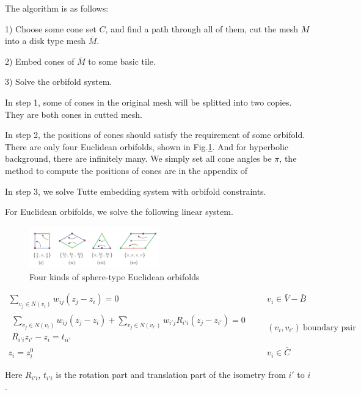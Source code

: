 The algorithm is as follows:

1) Choose some cone set $C$, and find a path through all of them, cut the mesh $M$ into a disk type mesh $\bar{M}$.

2) Embed cones of $\bar{M}$ to some basic tile.

3) Solve the orbifold system.

In step 1, some of cones in the original mesh will be splitted into two copies. They are both cones in cutted mesh. 

In step 2, the positions of cones should satisfy the requirement of some orbifold. There are only four Euclidean orbifolds, shown in Fig.\ref{fig:four-kinds}. And for hyperbolic background, there are infinitely many. We simply set all cone angles be $\pi$, the method to compute the positions of cones are in the appendix of \cite{Aigerman:2016:HOT:2980179.2982412}

In step 3, we solve Tutte embedding system with orbifold constraints.

For Euclidean orbifolds, we solve the following linear system.

\begin{figure}
\centering
\includegraphics[width=0.5\textwidth]{images/four_euc_orbifolds}
\caption{Four kinds of sphere-type Euclidean orbifolds}
\label{fig:four-kinds}
\end{figure}

\begin{equation}
\begin{split}
\sum_{v_j \in N(v_i)}w_{ij}(z_j - z_i) = 0 &\ \ \ \ \ \ v_i \in \bar{V}-\bar{B}\\
\begin{matrix}
\sum_{v_j \in N(v_i)}w_{ij}(z_j - z_i) + \sum_{v_j\in N(v_{i'})} w_{i'j}R_{i'i}(z_j - z_{i'})  = 0\\
R_{i'i}z_{i'} - z_i  = t_{ii'} 
\end{matrix} &\ \ \ \ \ \ (v_i, v_{i'})\ \text{boundary pair}\\
z_i = z_i^0  &\ \ \ \ \ \ v_i \in \bar{C}
\end{split}
\end{equation}

Here $R_{i'i}$, $t_{i'i}$ is the rotation part and translation part of the isometry from $i'$ to $i$.

